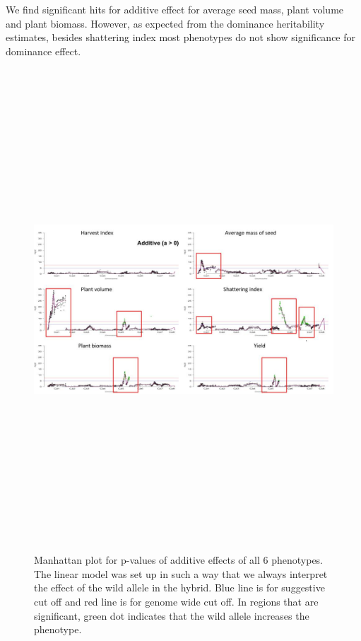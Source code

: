 We find significant hits for additive effect for average seed mass, plant volume and plant biomass. However, as expected from the dominance heritability estimates, besides shattering index most phenotypes do not show significance for dominance effect. 

\begin{figure}
    \centering
    \includegraphics[height=18cm, width=15cm]{tex/chickpea/manhattan-add.jpg}
    \caption{Manhattan plot for p-values of additive effects of all 6 phenotypes. The linear model was set up in such a way that we always interpret the effect of the wild allele in the hybrid. Blue line is for suggestive cut off and red line is for genome wide cut off. In regions that are significant, green dot indicates that the wild allele increases the phenotype.}
    \label{fig:man-add}
\end{figure}

